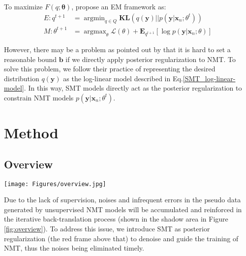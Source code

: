\documentclass[letterpaper]{article} \usepackage{aaai19}  \usepackage{times}  \usepackage{helvet}  \usepackage{courier}  \usepackage{url}  \usepackage{graphicx}  \usepackage{amsmath}
\newcommand{\newref}[1]{Eq.\eqref{#1}}
\newcommand{\bx}{\mathbf{x}}
\newcommand{\by}{\mathbf{y}}
\begin{document}
To maximize $F(q;\mathbf{\theta})$, \citeauthor{ganchev2010posterior}  propose an EM framework \cite{mclachlan2007algorithm} as:
\begin{equation}
\begin{aligned}
E: q^{t+1} 
&= \mathop{\arg\min}_{q \in Q}\mathbf{KL}(q(\by)||p(\by|\bx_{n};\theta^{t}))\\
M: {\theta}^{t+1} 
&= \mathop{\arg\max}_{\theta}\mathcal{L}(\theta) + \mathbf{E}_{q^{t+1}}[\log p(\by|\bx_{n};\theta)]
\end{aligned}
\label{PR_EM}
\end{equation}

However, there may be a problem as pointed out by \citeauthor{zhang2017prior}  that it is hard to set a reasonable bound $\mathbf{b}$ if we directly apply posterior regularization to NMT. To solve this problem, we follow their practice of representing the desired distribution $q(\by)$ as the log-linear model described in \newref{SMT_log-linear-model}. In this way, SMT models directly act as the posterior regularization to constrain NMT models $p(\by|\bx_{n};\theta^{t})$.


\section{Method}
\subsection{Overview}
\label{sec_overview}

\begin{figure*}[!htb]
\centering
\texttt{[image: Figures/overview.jpg]}
\caption{Method overview. The whole procedure mainly consists of two parts as the left and the right.}
\label{fig:overview}
\end{figure*}

Due to the lack of supervision, noises and infrequent errors in the pseudo data generated by unsupervised NMT models will be accumulated and reinforced in the iterative back-translation process (shown in the shadow area in Figure \ref{fig:overview}). To address this issue, we introduce SMT as posterior regularization (the red frame above that) to denoise and guide the training of NMT, thus the noises being eliminated timely.
\end{document}
